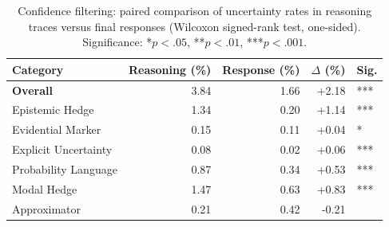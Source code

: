 \begin{table}[t]
\centering
\caption{Confidence filtering: paired comparison of uncertainty rates in reasoning traces versus final responses (Wilcoxon signed-rank test, one-sided). Significance: {*}$p < .05$, {**}$p < .01$, {***}$p < .001$.}
\label{tab:filtering}
\small
\begin{tabular}{lrrrl}
\toprule
Category & Reasoning (\%) & Response (\%) & $\Delta$ (\%) & Sig. \\
\midrule
\textbf{Overall} & 3.84 & 1.66 & +2.18 & *** \\
Epistemic Hedge & 1.34 & 0.20 & +1.14 & *** \\
Evidential Marker & 0.15 & 0.11 & +0.04 & * \\
Explicit Uncertainty & 0.08 & 0.02 & +0.06 & *** \\
Probability Language & 0.87 & 0.34 & +0.53 & *** \\
Modal Hedge & 1.47 & 0.63 & +0.83 & *** \\
Approximator & 0.21 & 0.42 & -0.21 &  \\
\bottomrule
\end{tabular}
\end{table}